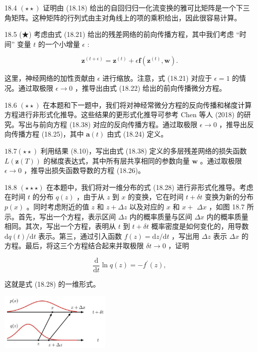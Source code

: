 \documentclass[10pt]{article}
\begin{document}
18.4 \(\left( {\star  \star  }\right)\) 证明由 (18.18) 给出的自回归归一化流变换的雅可比矩阵是一个下三角矩阵。这种矩阵的行列式由主对角线上的项的乘积给出，因此很容易计算。

18.5 (★) 考虑由式 (18.21) 给出的残差网络的前向传播方程，其中我们考虑 “时间” 变量 \(t\) 的一个小增量 \(\epsilon\) :

\[
{\mathbf{z}}^{\left( t + \epsilon \right) } = {\mathbf{z}}^{\left( t\right) } + \epsilon \mathbf{f}\left( {{\mathbf{z}}^{\left( t\right) },\mathbf{w}}\right) . \tag{18.38}
\]

这里，神经网络的加性贡献由 \(\epsilon\) 进行缩放。注意，式 (18.21) 对应于 \(\epsilon  = 1\) 的情况。通过取极限 \(\epsilon  \rightarrow  0\) ，推导出由式 (18.22) 给出的前向传播微分方程。

18.6 \(\left( {\star  \star  }\right)\) 在本题和下一题中，我们将对神经常微分方程的反向传播和梯度计算方程进行非形式化推导。这些结果的更形式化推导可参考 Chen 等人 (2018) 的研究。写出与前向方程 (18.38) 对应的反向传播方程。通过取极限 \(\epsilon  \rightarrow  0\) ，推导出反向传播方程 (18.25)，其中 \(\mathbf{a}\left( t\right)\) 由式 (18.24) 定义。

\({18.7}\left( {\star  \star  }\right)\) 利用结果 (8.10)，写出由式 (18.38) 定义的多层残差网络的损失函数 \(L\left( {\mathbf{z}\left( T\right) }\right)\) 的梯度表达式，其中所有层共享相同的参数向量 \(\mathbf{w}\) 。通过取极限 \(\epsilon  \rightarrow  0\) ，推导出损失函数导数的方程 (18.26)。

18.8 \(\left( {\star  \star   \star  }\right)\) 在本题中，我们将对一维分布的式 (18.28) 进行非形式化推导。考虑在时间 \(t\) 的分布 \(q\left( z\right)\) ，由于从 \(z\) 到 \(x\) 的变换，它在时间 \(t + {\delta t}\) 变换为新的分布 \(p\left( x\right)\) 。同时考虑附近的值 \(z\) 和 \(z + {\Delta z}\) 以及对应的 \(x\) 和 \(x +\)  \({\Delta x}\) ，如图 18.7 所示。首先，写出一个方程，表示区间 \({\Delta z}\) 内的概率质量与区间 \({\Delta x}\) 内的概率质量相同。其次，写出一个方程，表明从 \(t\) 到 \(t + {\delta t}\) 概率密度是如何变化的，用导数 \(\mathrm{d}q\left( t\right) /\mathrm{d}t\) 表示。第三，通过引入函数 \(f\left( z\right)  = \mathrm{d}z/\mathrm{d}t\) ，写出用 \({\Delta z}\) 表示 \({\Delta x}\) 的方程。最后，将这三个方程结合起来并取极限 \({\delta t} \rightarrow  0\) ，证明

\[
\frac{\mathrm{d}}{\mathrm{d}t}\ln q\left( z\right)  =  - {f}^{\prime }\left( z\right) , \tag{18.39}
\]

这就是式 (18.28) 的一维形式。

\begin{center}
\includegraphics[max width=0.4\textwidth]{images/0194e279-9b28-703a-88f4-c3ac21e2010d_579_928_1265_616_318_0.jpg}
\end{center}
\hspace*{3em} 
\end{document}
